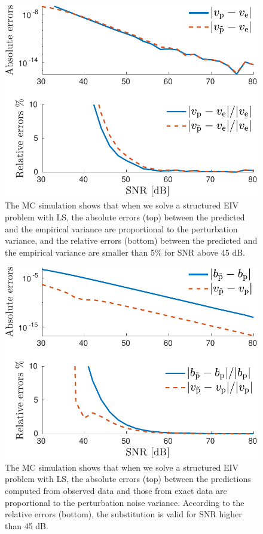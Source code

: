 \begin{figure}[htb!]
  \centering
  \includegraphics[width=1\columnwidth]{./ChapterStatisticalAnalysis/fig/Fig_7.pdf} 
  \caption{ \label{fig:v_vt_abse_rele_str_e7} The MC simulation shows that when we solve a structured EIV problem with LS, the absolute errors (top) between the predicted and the empirical variance are proportional to the perturbation variance, and the relative errors (bottom) between the predicted and the empirical variance are smaller than 5\% for SNR above 45 dB. }
\end{figure}

\begin{figure}[htb!]
  \centering
  \includegraphics[width=1\columnwidth]{./ChapterStatisticalAnalysis/fig/Fig_8.pdf} 
  \caption{ \label{fig:bv_btvt_abse_rele_str_e7} The MC simulation shows that when we solve a structured EIV problem with LS, the absolute errors (top) between the predictions computed from observed data and those from exact data are proportional to the perturbation noise variance. According to the relative errors (bottom), the substitution is valid for SNR higher than 45 dB. } 
\end{figure}

